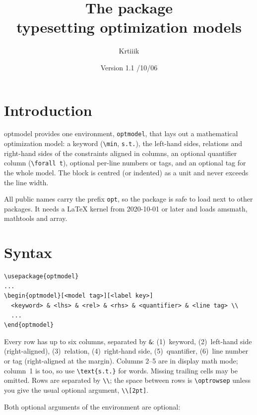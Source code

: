 \documentclass[a4paper,11pt]{article}
\title{The \pkg{optmodel} package\\[2pt]\large typesetting optimization models}
\author{Krtiiik}
\date{Version 1.1 \quad 2026/10/06}
\newcommand\cs[1]{\texttt{\textbackslash #1}}
\newcommand\pkg[1]{\textsf{#1}}
\begin{document}
\maketitle

\section{Introduction}

\pkg{optmodel} provides one environment, \texttt{optmodel}, that lays out a
mathematical optimization model: a keyword (\verb|\min|, \verb|s.t.|), the
left-hand sides, relations and right-hand sides of the constraints aligned in
columns, an optional quantifier column (\verb|\forall t|), optional per-line
numbers or tags, and an optional tag for the whole model.
The block is centred (or indented) as a unit and never exceeds the line width.

All public names carry the prefix \texttt{opt}, so the package is safe to load
next to other packages.
It needs a \LaTeX{} kernel from 2020-10-01 or later and loads \pkg{amsmath},
\pkg{mathtools} and \pkg{array}.

\section{Syntax}

\begin{verbatim}
\usepackage{optmodel}
...
\begin{optmodel}[<model tag>][<label key>]
  <keyword> & <lhs> & <rel> & <rhs> & <quantifier> & <line tag> \\
  ...
\end{optmodel}
\end{verbatim}

Every row has up to six columns, separated by \verb|&|:
(1)~keyword, (2)~left-hand side (right-aligned), (3)~relation, (4)~right-hand
side, (5)~quantifier, (6)~line number or tag (right-aligned at the margin).
Columns 2--5 are in display math mode; column~1 is too, so use \verb|\text{s.t.}|
for words.
Missing trailing cells may be omitted.
Rows are separated by \verb|\\|; the space between rows is \cs{optrowsep} unless
you give the usual optional argument, \verb|\\[2pt]|.

Both optional arguments of the environment are optional:
\end{document}
